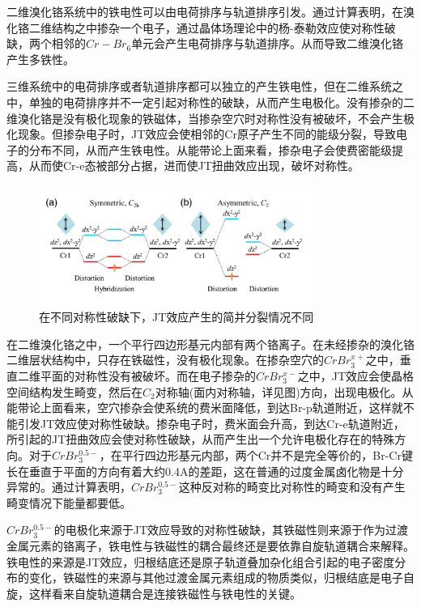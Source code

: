 二维溴化铬系统中的铁电性可以由电荷排序与轨道排序引发。通过计算表明，在溴化铬二维结构之中掺杂一个电子，通过晶体场理论中的杨-泰勒效应使对称性破缺，两个相邻的$Cr-Br_{6}$单元会产生电荷排序与轨道排序。从而导致二维溴化铬产生多铁性。



三维系统中的电荷排序或者轨道排序都可以独立的产生铁电性，但在二维系统之中，单独的电荷排序并不一定引起对称性的破缺，从而产生电极化。\cite{zhou2014carrier}没有掺杂的二维溴化铬是没有极化现象的铁磁体，当掺杂空穴时对称性没有被破坏，不会产生极化现象。但掺杂电子时，JT效应会使相邻的Cr原子产生不同的能级分裂，导致电子的分布不同，从而产生铁电性。从能带论上面来看，掺杂电子会使费密能级提高，从而使Cr-e态被部分占据，进而使JT扭曲效应出现，破坏对称性。\cite{BENGEL199595} 

\begin{figure}[h]
    \centering
\includegraphics[width=0.8\textwidth]{./pic/011-2.png}
\caption{在不同对称性破缺下，JT效应产生的简并分裂情况不同}

\label{dog011-2}
\end{figure}

在二维溴化铬之中，一个平行四边形基元内部有两个铬离子。在未经掺杂的溴化铬二维层状结构中，只存在铁磁性，没有极化现象。在掺杂空穴的$CrBr_{3}^{x+}$之中，垂直二维平面的对称性没有被破坏。而在电子掺杂的$CrBr_{3}^{x-}$之中，JT效应会使晶格空间结构发生畸变，然后在$C_{2}$对称轴(面内对称轴，详见图)方向，出现电极化。从能带论上面看来，空穴掺杂会使系统的费米面降低，到达Br-p轨道附近，这样就不能引发JT效应使对称性破缺。掺杂电子时，费米面会升高，到达Cr-e轨道附近，所引起的JT扭曲效应会使对称性破缺，从而产生出一个允许电极化存在的特殊方向。对于$CrBr_{3}^{0.5-}$，在平行四边形基元内部，两个Cr并不是完全等价的，Br-Cr键长在垂直于平面的方向有着大约0.4A的差距，这在普通的过度金属卤化物是十分异常的。通过计算表明，$CrBr_{3}^{0.5-}$这种反对称的畸变比对称性的畸变和没有产生畸变情况下能量都要低。

$CrBr_{3}^{0.5-}$的电极化来源于JT效应导致的对称性破缺，其铁磁性则来源于作为过渡金属元素的铬离子，铁电性与铁磁性的耦合最终还是要依靠自旋轨道耦合来解释。铁电性的来源是JT效应，归根结底还是原子轨道叠加杂化组合引起的电子密度分布的变化，铁磁性的来源与其他过渡金属元素组成的物质类似，归根结底是电子自旋，这样看来自旋轨道耦合是连接铁磁性与铁电性的关键。

